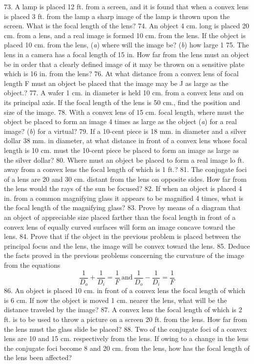 73. A lamp is placed 12 ft. from a screen, and it is found that when a convex lens is placed 3 ft. from the lamp a sharp image of the lamp is thrown upon the screen. What is the focal length of the lens?
74. An object 4 cm. long is placed 20 cm. from a lens, and a real image is formed 10 cm. from the lens. If the object is placed 10 cm. from the lens, (\emph{a}) where will the image be? (\emph{b}) how large 1
75. The lens in a camera has a focal length of 15 in. How far from the lens must an object be in order that a clearly defined image of it may be thrown on a sensitive plate which is 16 in. from the lens?
76. At what distance from a convex lens of focal length F must an object be placed that the image may be J as large as the object.?
77. A wafer 1 cm. in diameter is held 10 cm. from a convex lens and on its principal axis. If the focal length of the lens is 50 cm., find the position and size of the image.
78. With a convex lens of 15 cm. focal length, where must the object be placed to form an image 4 times as large as the object (\emph{a}) for a real image? (\emph{b}) for a virtual?
79. If a 10-cent piece is 18 mm. in diameter and a silver dollar 38 mm. in diameter, at what distance in front of a convex lens whose focal length is 10 cm. must the 10-cent piece be placed to form an image as large as the silver dollar?
80. Where must an object be placed to form a real image lo ft. away from a convex lens the focal length of which is 1 ft.?
81. The conjugate foci of a lens are 20 and 30 cm. distant from the lens on opposite sides. How far from the lens would the rays of the sun be focused?
82. If when an object is placed 4 in. from a common magnifying glass it appears to be magnified 4 times, what is the focal length of the magnifying glass?
83. Prove by means of a diagram that an object of appreciable size placed farther than the focal length in front of a convex lens of equally curved surfaces will form an image concave toward the lens.
84. Prove that if the object in the previous problem is placed between the principal focus and the lens, the image will be convex toward the lens.
85. Deduce the facts proved in the previous problems concerning the curvature of the image from the equations $$\frac{1}{D_o}+\frac{1}{D_i}=\frac{1}{F} \ \text{and}\ \frac{1}{D_o}-\frac{1}{D_i}=\frac{1}{F}$$
86. An object is placed 10 cm. in front of a convex lens the focal length of which is 6 cm. If now the object is moved 1 cm. nearer the lens, what will be the distance traveled by the image?
87. A convex lens the focal length of which is 2 ft. is to be used to throw a picture on a screen 20 ft. from the lens. How far from the lens must the glass slide be placed?
88. Two of the conjugate foci of a convex lens are 10 and 15 cm. respectively from the lens. If owing to a change in the lens the conjugate foci become 8 and 20 cm. from the lens, how has the focal length of the lens been affected?